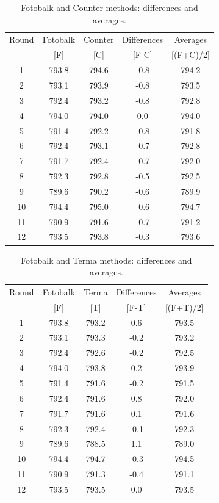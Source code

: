 \documentclass[12pt, a4paper]{report}
\theoremstyle{plain}
\theoremstyle{definition}
\theoremstyle{remark}
\begin{document}
	
	\begin{table}[h!]
		\renewcommand\arraystretch{0.7}%
		\begin{center}
			\begin{tabular}{|c||c|c||c|c|}
				\hline
				Round & Fotobalk  & Counter  & Differences  & Averages  \\
				&  [F] & [C] & [F-C] &  [(F+C)/2] \\
				\hline
				1 & 793.8 & 794.6 & -0.8 & 794.2 \\
				2 & 793.1 & 793.9 & -0.8 & 793.5 \\
				3 & 792.4 & 793.2 & -0.8 & 792.8 \\
				4 & 794.0 & 794.0 & 0.0 & 794.0 \\
				5 & 791.4 & 792.2 & -0.8 & 791.8 \\
				6 & 792.4 & 793.1 & -0.7 & 792.8 \\
				7 & 791.7 & 792.4 & -0.7 & 792.0 \\
				8 & 792.3 & 792.8 & -0.5 & 792.5 \\
				9 & 789.6 & 790.2 & -0.6 & 789.9 \\
				10 & 794.4 & 795.0 & -0.6 & 794.7 \\
				11 & 790.9 & 791.6 & -0.7 & 791.2 \\
				12 & 793.5 & 793.8 & -0.3 & 793.6 \\
				\hline
			\end{tabular}
			\caption{Fotobalk and Counter methods: differences and averages.}
		\end{center}
	\end{table}
	
	\begin{table}[h!]
		\renewcommand\arraystretch{0.7}%
		\begin{center}
			\begin{tabular}{|c||c|c||c|c|}
				\hline
				Round & Fotobalk  & Terma  & Differences  & Averages  \\
				&  [F] & [T] & [F-T] &  [(F+T)/2] \\
				\hline
				1 & 793.8 & 793.2 & 0.6 & 793.5 \\
				2 & 793.1 & 793.3 & -0.2 & 793.2 \\
				3 & 792.4 & 792.6 & -0.2 & 792.5 \\
				4 & 794.0 & 793.8 & 0.2 & 793.9 \\
				5 & 791.4 & 791.6 & -0.2 & 791.5 \\
				6 & 792.4& 791.6 & 0.8 & 792.0 \\
				7 & 791.7 & 791.6 & 0.1 & 791.6 \\
				8 & 792.3 & 792.4 & -0.1 & 792.3 \\
				9 & 789.6 & 788.5 & 1.1 & 789.0 \\
				10 & 794.4 & 794.7 & -0.3 & 794.5 \\
				11 & 790.9 & 791.3 & -0.4 & 791.1 \\
				12 & 793.5 & 793.5 & 0.0 & 793.5 \\
				
				\hline
			\end{tabular}
			\caption{Fotobalk and Terma methods: differences and averages.}
		\end{center}
	\end{table}
	
\end{document}
